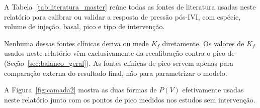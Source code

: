 A Tabela~\ref{tab:literatura_master} reúne todas as fontes de literatura usadas neste relatório para calibrar ou validar a resposta de pressão pós-IVI, com espécie, volume de injeção, basal, pico e tipo de intervenção.
 
\begin{table}[htbp]
\centering
\caption{Fontes de literatura usadas na parametrização e validação deste relatório (todas em humanos).}
\label{tab:literatura_master}
\small
{}
 
\vspace{4pt}
\end{table}
\FloatBarrier
 
Nenhuma dessas fontes clínicas deriva ou mede $K_f$ diretamente. Os valores de $K_f$ usados neste relatório vêm exclusivamente da recalibração contra o pico de \citet{knecht2009} (Seção~\ref{sec:balanco_geral}). As fontes clínicas de pico servem apenas para comparação externa do resultado final, não para parametrizar o modelo.

A Figura~\ref{fig:camada2} mostra as duas formas de $P(V)$ efetivamente usadas neste relatório junto com os pontos de pico medidos nos estudos sem intervenção.

